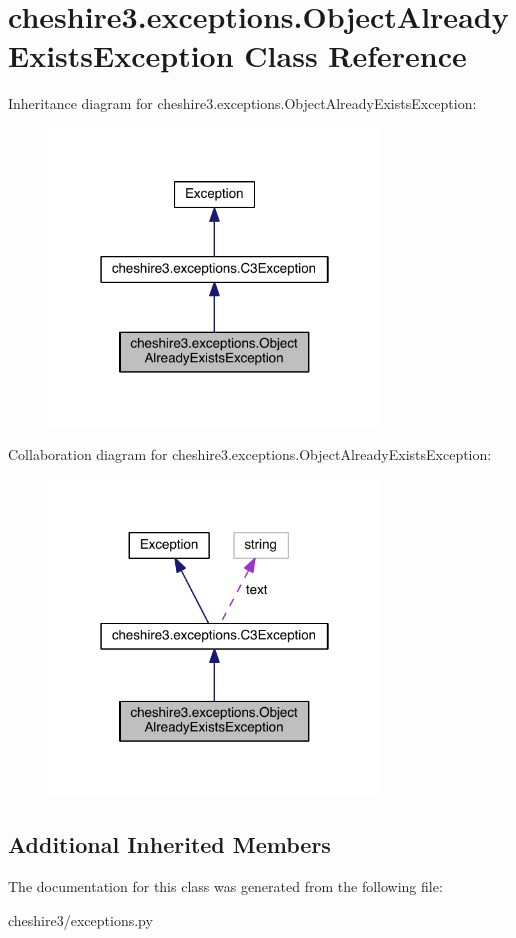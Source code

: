 \hypertarget{classcheshire3_1_1exceptions_1_1_object_already_exists_exception}{\section{cheshire3.\-exceptions.\-Object\-Already\-Exists\-Exception Class Reference}
\label{classcheshire3_1_1exceptions_1_1_object_already_exists_exception}
}


Inheritance diagram for cheshire3.\-exceptions.\-Object\-Already\-Exists\-Exception\-:
\nopagebreak
\begin{figure}[H]
\begin{center}
\leavevmode
\includegraphics[width=250pt]{classcheshire3_1_1exceptions_1_1_object_already_exists_exception__inherit__graph}
\end{center}
\end{figure}


Collaboration diagram for cheshire3.\-exceptions.\-Object\-Already\-Exists\-Exception\-:
\nopagebreak
\begin{figure}[H]
\begin{center}
\leavevmode
\includegraphics[width=250pt]{classcheshire3_1_1exceptions_1_1_object_already_exists_exception__coll__graph}
\end{center}
\end{figure}
\subsection*{Additional Inherited Members}


The documentation for this class was generated from the following file\-:\begin{DoxyCompactItemize}
\item 
cheshire3/exceptions.\-py\end{DoxyCompactItemize}
